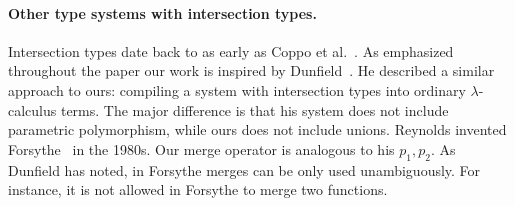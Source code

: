 \begin{comment}
only allow intersections of concrete types (classes),
whereas our language allows intersections of type variables, such as
\texttt{A \& B}. Without that vehicle, we would not be able to define
the generic \texttt{merge} function (below) for all interpretations of
a given algebra, and would incur boilerplate code:

\begin{lstlisting}
let merge [A, B] (f: ExpAlg A) (g: ExpAlg B) = {
  lit (x : Int) = f.lit x ,, g.lit x,
  add (x : A & B) (y : A & B) =
    f.add x y ,, g.add x y
}
\end{lstlisting}
\end{comment}


\paragraph{Other type systems with intersection types.}
Intersection types date back to as early as Coppo et
al.~\cite{coppo1981functional}. As emphasized throughout the paper our
work is inspired by Dunfield~\cite{dunfield2014elaborating}. He described a similar approach to ours:
compiling a system with intersection types into ordinary $ \lambda $-calculus
terms. The major difference is that his system does not include parametric
polymorphism, while ours does not include unions.
Reynolds invented Forsythe~\cite{reynolds1997design} in the 1980s. Our merge
operator is analogous to his $ p_1, p_2 $. As Dunfield
has noted, in Forsythe merges can be only used unambiguously.
For instance, it is not allowed in Forsythe to merge two functions.



